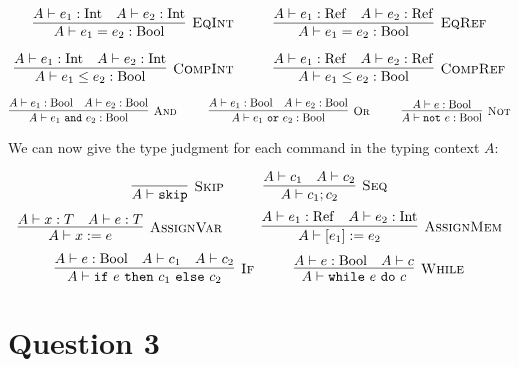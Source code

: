 \documentclass{article}
\newcommand{\Rule}[3]{\infer[\textsc{#1}]{#2}{#3}}
\newcommand{\Ref}{\mathrm{Ref}}
\newcommand{\Int}{\mathrm{Int}}
\newcommand{\Bool}{\mathrm{Bool}}
\begin{document}
\[
\Rule{EqInt}{A \vdash e_1 = e_2: \Bool}{A \vdash e_1: \Int \quad A \vdash e_2: \Int}
\hspace*{1cm}
\Rule{EqRef}{A \vdash e_1 = e_2: \Bool}{A \vdash e_1: \Ref \quad A \vdash e_2: \Ref}
\]

\[
\Rule{CompInt}{A \vdash e_1 \leq e_2: \Bool}{A \vdash e_1: \Int \quad A \vdash e_2: \Int}
\hspace*{1cm}
\Rule{CompRef}{A \vdash e_1 \leq e_2: \Bool}{A \vdash e_1: \Ref \quad A \vdash e_2: \Ref}
\]

\[
\Rule{And}{A \vdash e_1~\texttt{and}~e_2: \Bool}{A \vdash e_1: \Bool \quad A \vdash e_2: \Bool}
\hspace*{1cm}
\Rule{Or}{A \vdash e_1~\texttt{or}~e_2: \Bool}{A \vdash e_1: \Bool \quad A \vdash e_2: \Bool}
\hspace*{1cm}
\Rule{Not}{A \vdash \texttt{not}~e: \Bool}{A \vdash e: \Bool}
\]

We can now give the type judgment for each command in the typing context $A$:

\[
	\Rule{Skip}{A \vdash \texttt{skip}}{} \hspace*{1cm}
	\Rule{Seq}{A \vdash c_1 ; c_2}{A \vdash c_1 \quad A \vdash c_2}
\]
\[
	\Rule{AssignVar}{A \vdash x := e}{A \vdash x: T \quad A \vdash e: T} \hspace*{1cm}
	\Rule{AssignMem}{A \vdash [e_1] := e_2}{A \vdash e_1: \Ref \quad A \vdash e_2: \Int}
\]
\[
	\Rule{If}{A \vdash \texttt{if}~e~\texttt{then}~c_1~\texttt{else}~c_2}{A \vdash e: \Bool \quad A \vdash c_1 \quad A \vdash c_2}
\hspace*{1cm}
	\Rule{While}{A \vdash \texttt{while}~e~\texttt{do}~c}{A \vdash e: \Bool \quad A \vdash c} 
\]
	
\section*{Question 3}
\end{document}

